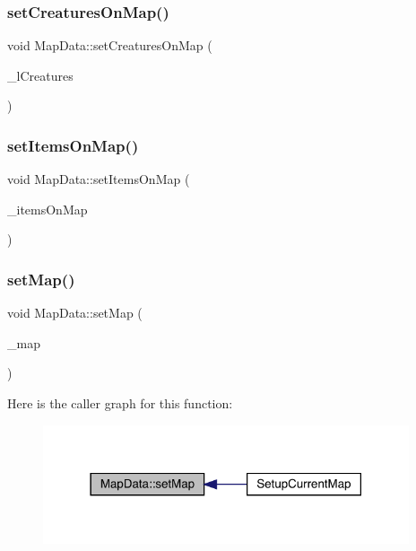 \subsubsection{\texorpdfstring{set\+Creatures\+On\+Map()}{setCreaturesOnMap()}}
{\footnotesize\ttfamily void Map\+Data\+::set\+Creatures\+On\+Map (\begin{DoxyParamCaption}\item[{std\+::list$<$ \mbox{\hyperlink{class_base_creature}{Base\+Creature}} $>$}]{\+\_\+l\+Creatures }\end{DoxyParamCaption})}

\mbox{\label{class_map_data_a44e4f889a01270765db90de0ebb62aa5}} 
\subsubsection{\texorpdfstring{set\+Items\+On\+Map()}{setItemsOnMap()}}
{\footnotesize\ttfamily void Map\+Data\+::set\+Items\+On\+Map (\begin{DoxyParamCaption}\item[{std\+::list$<$ \mbox{\hyperlink{class_item}{Item}} $\ast$$>$}]{\+\_\+items\+On\+Map }\end{DoxyParamCaption})}

\mbox{\label{class_map_data_a8adfe57c9e74b6e306540dcb003feb95}} 
\subsubsection{\texorpdfstring{set\+Map()}{setMap()}}
{\footnotesize\ttfamily void Map\+Data\+::set\+Map (\begin{DoxyParamCaption}\item[{\mbox{\hyperlink{class_map}{Map}} $\ast$}]{\+\_\+map }\end{DoxyParamCaption})}

Here is the caller graph for this function\+:
\nopagebreak
\begin{figure}[H]
\begin{center}
\leavevmode
\includegraphics[width=306pt]{de/d83/class_map_data_a8adfe57c9e74b6e306540dcb003feb95_icgraph}
\end{center}
\end{figure}
\mbox{\label{class_map_data_a2c65f950748fe264276e292f8a5b92f5}} 
